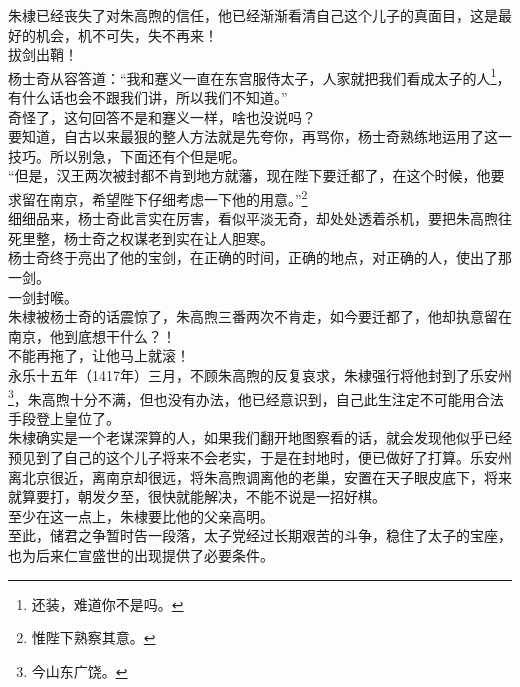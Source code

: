 \begin{multicols}{\theparacolNo}
朱棣已经丧失了对朱高煦的信任，他已经渐渐看清自己这个儿子的真面目，这是最好的机会，机不可失，失不再来！\\

拔剑出鞘！\\

杨士奇从容答道：“我和蹇义一直在东宫服侍太子，人家就把我们看成太子的人\footnote{还装，难道你不是吗。}，有什么话也会不跟我们讲，所以我们不知道。”\\

奇怪了，这句回答不是和蹇义一样，啥也没说吗？\\

要知道，自古以来最狠的整人方法就是先夸你，再骂你，杨士奇熟练地运用了这一技巧。所以别急，下面还有个但是呢。\\

“但是，汉王两次被封都不肯到地方就藩，现在陛下要迁都了，在这个时候，他要求留在南京，希望陛下仔细考虑一下他的用意。”\footnote{惟陛下熟察其意。}\\

细细品来，杨士奇此言实在厉害，看似平淡无奇，却处处透着杀机，要把朱高煦往死里整，杨士奇之权谋老到实在让人胆寒。\\

杨士奇终于亮出了他的宝剑，在正确的时间，正确的地点，对正确的人，使出了那一剑。\\

一剑封喉。\\

朱棣被杨士奇的话震惊了，朱高煦三番两次不肯走，如今要迁都了，他却执意留在南京，他到底想干什么？！\\

不能再拖了，让他马上就滚！\\

永乐十五年（1417年）三月，不顾朱高煦的反复哀求，朱棣强行将他封到了乐安州\footnote{今山东广饶。}，朱高煦十分不满，但也没有办法，他已经意识到，自己此生注定不可能用合法手段登上皇位了。\\

朱棣确实是一个老谋深算的人，如果我们翻开地图察看的话，就会发现他似乎已经预见到了自己的这个儿子将来不会老实，于是在封地时，便已做好了打算。乐安州离北京很近，离南京却很远，将朱高煦调离他的老巢，安置在天子眼皮底下，将来就算要打，朝发夕至，很快就能解决，不能不说是一招好棋。\\

至少在这一点上，朱棣要比他的父亲高明。\\

至此，储君之争暂时告一段落，太子党经过长期艰苦的斗争，稳住了太子的宝座，也为后来仁宣盛世的出现提供了必要条件。\\


\end{multicols}

